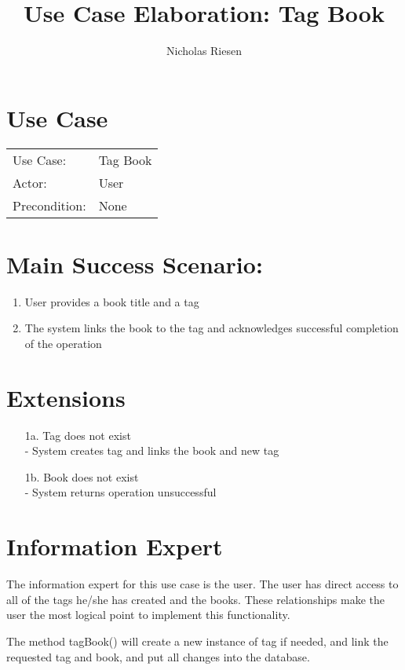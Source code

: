 \documentclass{article}
\title{Use Case Elaboration: Tag Book}
\author{Nicholas Riesen}
\begin{document}
\maketitle

\section*{Use Case}
 \begin{tabular}{l l}
 
Use Case:     & Tag Book \\
Actor:        & User     \\
Precondition: & None     \\
\end{tabular}

\section*{Main Success Scenario:}
\begin{enumerate}
    \item User provides a book title and a tag
    \item The system links the book to the tag and acknowledges successful completion of the operation
\end{enumerate}

\section*{Extensions}
\begin{itemize}
    \item[1a.] Tag does not exist \\
    - System creates tag and links the book and new tag

    \item[1b.] Book does not exist \\
    - System returns operation unsuccessful
    
\end{itemize}

\section*{Information Expert}
The information expert for this use case is the user. The user has direct access to all of the tags he/she has created and the books. These relationships make the user the most logical point to implement this functionality.

The method tagBook() will create a new instance of tag if needed, and link the requested tag and book, and put all changes into the database.
\end{document}
